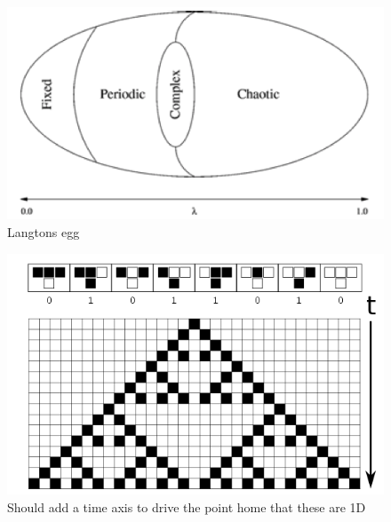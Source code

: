 \begin{figure}[h!]
  \centering
  \includegraphics[width=1\textwidth]{fig/Langtons_egg2.png}
  \caption{Langtons egg}
  \label{figCAegg}
\end{figure}
\begin{figure}[h!]
  \centering
  \includegraphics[width=1\textwidth]{fig/ca22.png}
  \caption{Should add a time axis to drive the point home that these are 1D}
  \label{figCA22}
\end{figure}
